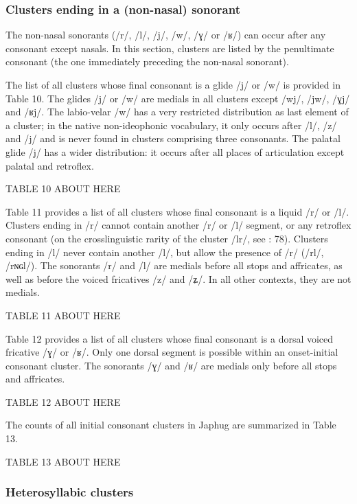 \documentclass[12pt]{article}
\newcommand{\ipa}[1]{\mbox{\phon/#1/}}
\begin{document}
 \subsubsection*{Clusters ending in a (non-nasal) sonorant}   \label{sec:medial}
  The non-nasal sonorants (\ipa{r}, \ipa{l}, \ipa{j}, \ipa{w}, \ipa{ɣ} or \ipa{ʁ}) can occur after any consonant except nasals. In this section, clusters are listed by the penultimate consonant  (the one immediately preceding the non-nasal sonorant).  
  
 The list of all clusters whose final consonant is a glide  \ipa{j} or \ipa{w} is provided in Table 10. The glides  \ipa{j} or \ipa{w} are medials in all clusters except \ipa{wj}, \ipa{jw}, \ipa{ɣj} and \ipa{ʁj}. The labio-velar \ipa{w} has a very restricted distribution as last element of a cluster; in the native non-ideophonic vocabulary, it only occurs after \ipa{l}, \ipa{z} and \ipa{j} and is never found in clusters comprising three consonants. The palatal glide \ipa{j} has a wider distribution: it occurs after all places of articulation except palatal and retroflex.
  
TABLE 10 ABOUT HERE   
   
  Table 11 provides a  list of all clusters whose final consonant is a liquid  \ipa{r} or \ipa{l}. Clusters ending in \ipa{r} cannot contain another \ipa{r} or \ipa{l} segment, or any retroflex consonant (on the crosslinguistic rarity of the cluster \ipa{lr}, see \citealt{baroni14invariant}: 78). Clusters ending in \ipa{l} never contain another \ipa{l}, but allow the presence of \ipa{r} (\ipa{rl}, \ipa{rɴɢl}). The sonorants \ipa{r} and \ipa{l} are medials before all stops and affricates, as well as before the voiced fricatives \ipa{z} and \ipa{ʑ}. In all other contexts, they are not medials.
   
TABLE 11 ABOUT HERE   
  
Table 12 provides a  list of all clusters whose final consonant is a dorsal voiced fricative  \ipa{ɣ} or \ipa{ʁ}.  Only one dorsal segment is possible within an onset-initial consonant cluster. The sonorants \ipa{ɣ} and \ipa{ʁ} are medials only before all stops and affricates.
						
TABLE 12 ABOUT HERE   

The counts of all initial consonant clusters in Japhug are summarized in Table 13.

TABLE 13 ABOUT HERE   
 
  
 \subsubsection*{Heterosyllabic clusters} \label{sec:heterosyllabic.clusters}
 
\end{document}
